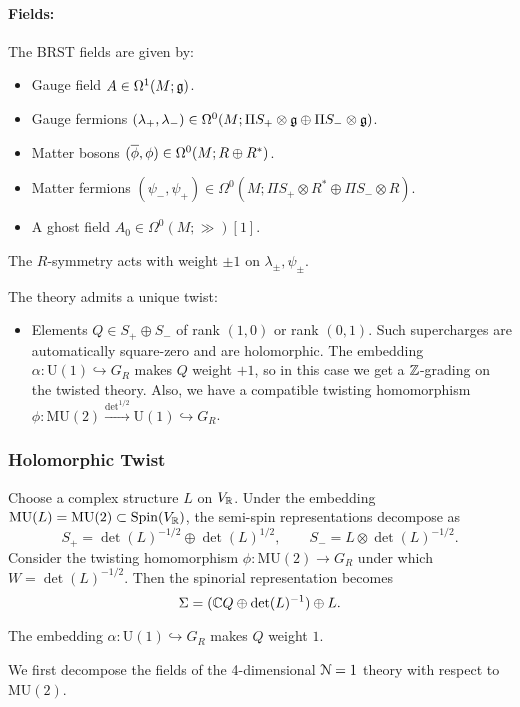\documentclass[10pt, oneside]{article}
\newcommand{\MU}{\mathrm{MU}}
\renewcommand{\U}{\mathrm{U}}
\begin{document}
\paragraph{Fields:} The BRST fields are given by:
\begin{itemize}
\item Gauge field $A \in \Omega^1(M; \fg)$.
\item Gauge fermions $(\lambda_+, \lambda_-) \in \Omega^0(M; \Pi S_+ \otimes \fg \oplus \Pi S_- \otimes \fg)$.
\item Matter bosons $(\Bar{\phi}, \phi) \in \Omega^0(M; R \oplus R^*)$.
\item Matter fermions $(\psi_-,\psi_+) \in \Omega^0(M; \Pi S_+ \otimes R^* \oplus \Pi S_- \otimes R)$.
\item A ghost field $A_0\in \Omega^0(M; \gg)[1]$.
\end{itemize}

The $R$-symmetry acts with weight $\pm 1$ on $\lambda_\pm, \psi_\pm$.

The theory admits a unique twist:
\begin{itemize}
\item Elements $Q\in S_+\oplus S_-$ of rank $(1, 0)$ or rank $(0, 1)$. Such supercharges are automatically square-zero and are holomorphic. The embedding $\alpha \colon \U(1) \hookrightarrow G_R$ makes $Q$ weight $+1$, so in this case we get a $\ZZ$-grading on the twisted theory. Also, we have a compatible twisting homomorphism $\phi\colon \MU(2)\xrightarrow{\det^{1/2}}\U(1)\hookrightarrow G_R$.
\end{itemize}

\subsubsection{Holomorphic Twist}
\label{sect:4d1holomorphictwist}

Choose a complex structure $L$ on $V_\RR$. Under the embedding $\MU(L) = \MU(2) \subset \Spin(V_\RR)$, the semi-spin representations decompose as
\[
S_+ = \det(L)^{-1/2} \oplus \det(L)^{1/2},\qquad S_- = L \otimes \det(L)^{-1/2} .
\]
Consider the twisting homomorphism $\phi\colon\MU(2)\rightarrow G_R$ under which $W = \det(L)^{-1/2}$. Then the spinorial representation becomes
\[\Sigma = (\CC Q\oplus \det(L)^{-1})\oplus L.\]

The embedding $\alpha\colon \U(1)\hookrightarrow G_R$ makes $Q$ weight $1$.

We first decompose the fields of the 4-dimensional $\mc N=1$ theory with respect to $\MU(2)$.
\vspace{-10pt}
\end{document}
